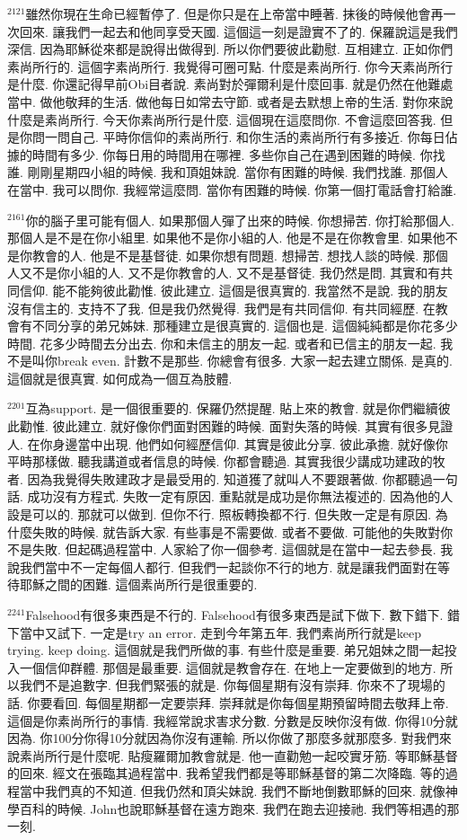 \documentclass{book}
\begin{document}
$^{2121}$雖然你現在生命已經暫停了.
但是你只是在上帝當中睡著.
抹後的時候他會再一次回來.
讓我們一起去和他同享受天國.
這個這一刻是證實不了的.
保羅說這是我們深信.
因為耶穌從來都是說得出做得到.
所以你們要彼此勸慰.
互相建立.
正如你們素尚所行的.
這個字素尚所行.
我覺得可圈可點.
什麼是素尚所行.
你今天素尚所行是什麼.
你還記得早前Obi目者說.
素尚對於彈爾利是什麼回事.
就是仍然在他難處當中.
做他敬拜的生活.
做他每日如常去守節.
或者是去默想上帝的生活.
對你來說什麼是素尚所行.
今天你素尚所行是什麼.
這個現在這麼問你.
不會這麼回答我.
但是你問一問自己.
平時你信仰的素尚所行.
和你生活的素尚所行有多接近.
你每日佔據的時間有多少.
你每日用的時間用在哪裡.
多些你自己在遇到困難的時候.
你找誰.
剛剛星期四小組的時候.
我和頂姐妹說.
當你有困難的時候.
我們找誰.
那個人在當中.
我可以問你.
我經常這麼問.
當你有困難的時候.
你第一個打電話會打給誰.

$^{2161}$你的腦子里可能有個人.
如果那個人彈了出來的時候.
你想掃苦.
你打給那個人.
那個人是不是在你小組里.
如果他不是你小組的人.
他是不是在你教會里.
如果他不是你教會的人.
他是不是基督徒.
如果你想有問題.
想掃苦.
想找人談的時候.
那個人又不是你小組的人.
又不是你教會的人.
又不是基督徒.
我仍然是問.
其實和有共同信仰.
能不能夠彼此勸惟.
彼此建立.
這個是很真實的.
我當然不是說.
我的朋友沒有信主的.
支持不了我.
但是我仍然覺得.
我們是有共同信仰.
有共同經歷.
在教會有不同分享的弟兄姊妹.
那種建立是很真實的.
這個也是.
這個純純都是你花多少時間.
花多少時間去分出去.
你和未信主的朋友一起.
或者和已信主的朋友一起.
我不是叫你break even.
計數不是那些.
你總會有很多.
大家一起去建立關係.
是真的.
這個就是很真實.
如何成為一個互為肢體.

$^{2201}$互為support.
是一個很重要的.
保羅仍然提醒.
貼上來的教會.
就是你們繼續彼此勸惟.
彼此建立.
就好像你們面對困難的時候.
面對失落的時候.
其實有很多見證人.
在你身邊當中出現.
他們如何經歷信仰.
其實是彼此分享.
彼此承擔.
就好像你平時那樣做.
聽我講道或者信息的時候.
你都會聽過.
其實我很少講成功建政的牧者.
因為我覺得失敗建政才是最受用的.
知道獲了就叫人不要跟著做.
你都聽過一句話.
成功沒有方程式.
失敗一定有原因.
重點就是成功是你無法複述的.
因為他的人設是可以的.
那就可以做到.
但你不行.
照板轉換都不行.
但失敗一定是有原因.
為什麼失敗的時候.
就告訴大家.
有些事是不需要做.
或者不要做.
可能他的失敗對你不是失敗.
但起碼過程當中.
人家給了你一個參考.
這個就是在當中一起去參長.
我說我們當中不一定每個人都行.
但我們一起談你不行的地方.
就是讓我們面對在等待耶穌之間的困難.
這個素尚所行是很重要的.

$^{2241}$Falsehood有很多東西是不行的.
Falsehood有很多東西是試下做下.
數下錯下.
錯下當中又試下.
一定是try an error.
走到今年第五年.
我們素尚所行就是keep trying.
keep doing.
這個就是我們所做的事.
有些什麼是重要.
弟兄姐妹之間一起投入一個信仰群體.
那個是最重要.
這個就是教會存在.
在地上一定要做到的地方.
所以我們不是追數字.
但我們緊張的就是.
你每個星期有沒有崇拜.
你來不了現場的話.
你要看回.
每個星期都一定要崇拜.
崇拜就是你每個星期預留時間去敬拜上帝.
這個是你素尚所行的事情.
我經常說求害求分數.
分數是反映你沒有做.
你得10分就因為.
你100分你得10分就因為你沒有運輸.
所以你做了那麼多就那麼多.
對我們來說素尚所行是什麼呢.
貼瘦羅爾加教會就是.
他一直勸勉一起咬實牙筋.
等耶穌基督的回來.
經文在張臨其過程當中.
我希望我們都是等耶穌基督的第二次降臨.
等的過程當中我們真的不知道.
但我仍然和頂尖妹說.
我們不斷地倒數耶穌的回來.
就像神學百科的時候.
John也說耶穌基督在遠方跑來.
我們在跑去迎接祂.
我們等相遇的那一刻.
\end{document}
